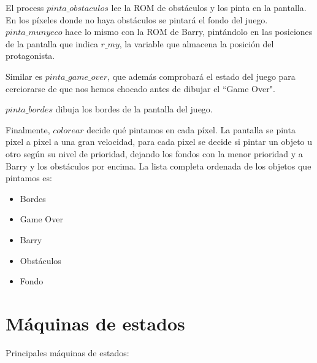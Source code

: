 \documentclass[11pt, a4paper, spanish, openright, twoside]{book}
\begin{document}
El process $pinta\_obstaculos$ lee la ROM de obstáculos y los pinta en la pantalla. En los píxeles donde no haya obstáculos se pintará el fondo del juego. $pinta\_munyeco$ hace lo mismo con la ROM de Barry, pintándolo en las posiciones de la pantalla que indica $r\_my$, la variable que almacena la posición del protagonista.

Similar es $pinta\_game\_over$, que además comprobará el estado del juego para cerciorarse de que nos hemos chocado antes de dibujar el ``Game Over".

$pinta\_bordes$ dibuja los bordes de la pantalla del juego.

Finalmente, $colorear$ decide qué pintamos en cada píxel. La pantalla se pinta pixel a pixel a una gran velocidad, para cada pixel se decide si pintar un objeto u otro según su nivel de prioridad, dejando los fondos con la menor prioridad y a Barry y los obstáculos por encima. La lista completa ordenada de los objetos que pintamos es:
\begin{itemize}
	\item Bordes
	\item Game Over
	\item Barry
	\item Obstáculos
	\item Fondo
\end{itemize}

\section{Máquinas de estados}

Principales máquinas de estados:
\end{document}
